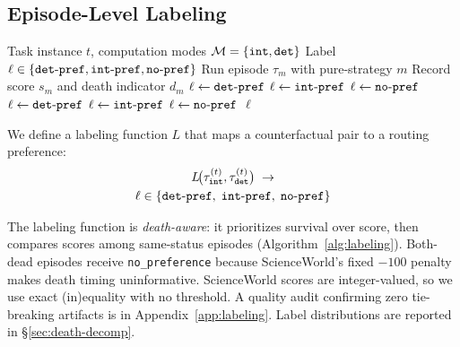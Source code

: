 \subsection{Episode-Level Labeling}
\label{sec:labeling}

\begin{algorithm}[t]
\caption{Episode-Level Counterfactual Labeling}
\label{alg:labeling}
\begin{algorithmic}[1]
\REQUIRE Task instance $t$, computation modes $\mathcal{M} = \{{\tt int}, {\tt det}\}$
\ENSURE Label $\ell \in \{{\tt det\text{-}pref}, {\tt int\text{-}pref}, {\tt no\text{-}pref}\}$
    \STATE Run episode $\tau_m$ with pure-strategy $m$
    \STATE Record score $s_m$ and death indicator $d_m$
\ENDFOR
{}
    \STATE $\ell \leftarrow {\tt det\text{-}pref}$ 
    \STATE $\ell \leftarrow {\tt int\text{-}pref}$ 
    \STATE $\ell \leftarrow {\tt no\text{-}pref}$ 
    \STATE $\ell \leftarrow {\tt det\text{-}pref}$ 
    \STATE $\ell \leftarrow {\tt int\text{-}pref}$ 
\ELSE
    \STATE $\ell \leftarrow {\tt no\text{-}pref}$ 
\ENDIF
\RETURN $\ell$
\end{algorithmic}
\end{algorithm}

We define a labeling function $L$ that maps a counterfactual pair to a routing preference:
\begin{multline}
    L\!\bigl(\tau_{\tt int}^{(t)}, \tau_{\tt det}^{(t)}\bigr) \;\rightarrow \\
    \ell \in \{{\tt det\text{-}pref},\; {\tt int\text{-}pref},\; {\tt no\text{-}pref}\}
\end{multline}

The labeling function is \emph{death-aware}: it prioritizes survival over score, then compares scores among same-status episodes (Algorithm~\ref{alg:labeling}). Both-dead episodes receive \texttt{no\_preference} because ScienceWorld's fixed $-100$ penalty makes death timing uninformative. ScienceWorld scores are integer-valued, so we use exact (in)equality with no threshold. A quality audit confirming zero tie-breaking artifacts is in Appendix~\ref{app:labeling}. Label distributions are reported in \S\ref{sec:death-decomp}.

